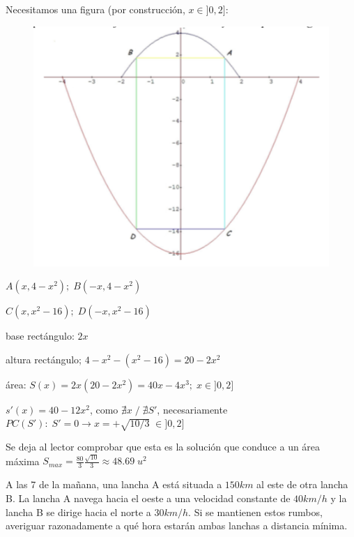 	\begin{proofw}\renewcommand{\qedsymbol}{$\diamond$}
	
	\begin{multicols}{2}
	
	Necesitamos una figura (por construcción, $x \in ]0,2]$:
	\begin{figure}[H]
	\centering
	\includegraphics[width=.4\textwidth]{imagenes/imagenes05/T05IM24.png}
	\end{figure}
	 $A(x, 4-x^2); \; B(-x, 4-x^2)$
	 
	 $C(x,x^2-16); \; D(-x, x^2-16)$
	 
	 base rectángulo: $2x$
	 
	 altura rectángulo; $4-x^2-(x^2-16)=20-2x^2$
	 
	 área: $S(x)=2x(20-2x^2)=40x-4x^3; \;  x \in ]0,2]$
	 
	 $s'(x)=40-12x^2$, como $\nexists x\; / \; \nexists S'$, necesariamente $PC(S'): \; S'=0\to x=+\sqrt {10/3} \; \in ]0,2]$
	 
	\end{multicols}

	 Se deja al lector comprobar que esta es la solución que conduce a un área máxima $S_{max}=\frac {80}3	\frac {\sqrt{10}} 3 \approx 48.69\; u^2$
	\end{proofw}
	
	\begin{ejre} A las 7 de la mañana, una lancha A está situada a $150 km$ al este de otra lancha B. La lancha A navega hacia el oeste a una velocidad constante de $40 km/h$ y la lancha B se dirige hacia el norte a $30 km/h$. Si se mantienen estos rumbos, averiguar razonadamente a qué hora estarán ambas lanchas a distancia mínima.	
	\end{ejre}

